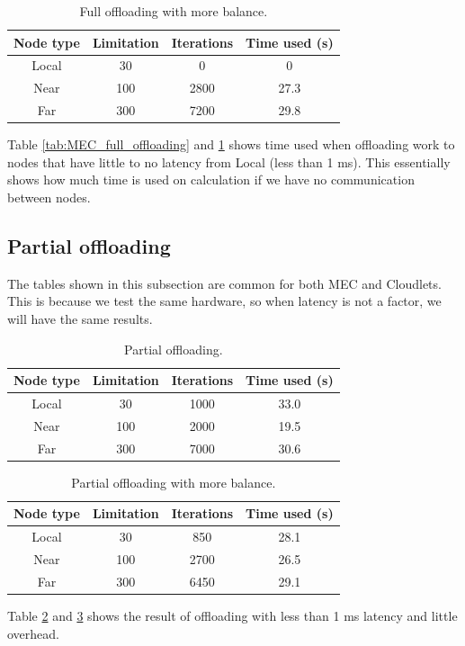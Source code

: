 \begin{table}[h!]
    \centering
    \begin{tabular}[c]{|c|c|c|c|}
        \hline
        Node type & Limitation & Iterations & Time used (s)\\
        \hline
        \hline
        Local & 30 & 0 & 0 \\
        \hline
        Near & 100 & 2800 & 27.3 \\
        \hline
        Far & 300 & 7200 & 29.8 \\
        \hline
    \end{tabular}
    \caption{Full offloading with more balance.}
    \label{tab:MEC_full_offloading_balanced}
\end{table}

Table \ref{tab:MEC_full_offloading} and \ref{tab:MEC_full_offloading_balanced} shows time used when offloading work to nodes that have little to no latency from Local (less than 1 ms). This essentially shows how much time is used on calculation if we have no communication between nodes. 

\subsection{Partial offloading}
The tables shown in this subsection are common for both MEC and Cloudlets. This is because we test the same hardware, so when latency is not a factor, we will have the same results.
\begin{table}[h!]
    \centering
    \begin{tabular}[c]{|c|c|c|c|}
        \hline
        Node type & Limitation & Iterations & Time used (s)\\
        \hline
        \hline
        Local & 30 & 1000 & 33.0 \\
        \hline
        Near & 100 & 2000 & 19.5 \\
        \hline
        Far & 300 & 7000 & 30.6 \\
        \hline
    \end{tabular}
    \caption{Partial offloading.}
    \label{tab:MEC_partial_offloading}
\end{table}


\begin{table}[h!]
    \centering
    \begin{tabular}[c]{|c|c|c|c|}
        \hline
        Node type & Limitation & Iterations & Time used (s)\\
        \hline
        \hline
        Local & 30 & 850 & 28.1 \\
        \hline
        Near & 100 & 2700 & 26.5 \\
        \hline
        Far & 300 & 6450 & 29.1 \\
        \hline
    \end{tabular}
    \caption{Partial offloading with more balance.}
    \label{tab:MEC_partial_offloading_balanced}
\end{table}
Table \ref{tab:MEC_partial_offloading} and \ref{tab:MEC_partial_offloading_balanced} shows the result of offloading with less than 1 ms latency and little overhead.







